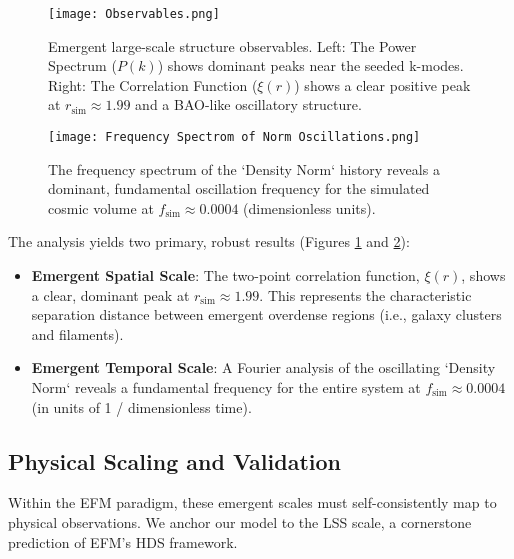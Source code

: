 \documentclass[11pt]{article}
\begin{document}
\begin{figure}[htbp]
\centering
\texttt{[image: Observables.png]} %
\caption{Emergent large-scale structure observables. Left: The Power Spectrum (\(P(k)\)) shows dominant peaks near the seeded k-modes. Right: The Correlation Function (\(\xi(r)\)) shows a clear positive peak at \(r_{\text{sim}} \approx 1.99\) and a BAO-like oscillatory structure.}
\label{fig:lss_observables}
\end{figure}

\begin{figure}[htbp]
\centering
\texttt{[image: Frequency Spectrom of Norm Oscillations.png]} %
\caption{The frequency spectrum of the `Density Norm` history reveals a dominant, fundamental oscillation frequency for the simulated cosmic volume at \(f_{\text{sim}} \approx 0.0004\) (dimensionless units).}
\label{fig:frequency_spectrum}
\end{figure}

The analysis yields two primary, robust results (Figures \ref{fig:lss_observables} and \ref{fig:frequency_spectrum}):
\begin{itemize}
    \item \textbf{Emergent Spatial Scale}: The two-point correlation function, \(\xi(r)\), shows a clear, dominant peak at \(r_{\text{sim}} \approx 1.99\). This represents the characteristic separation distance between emergent overdense regions (i.e., galaxy clusters and filaments).
    \item \textbf{Emergent Temporal Scale}: A Fourier analysis of the oscillating `Density Norm` reveals a fundamental frequency for the entire system at \(f_{\text{sim}} \approx 0.0004\) (in units of 1 / dimensionless time).
\end{itemize}

\subsection{Physical Scaling and Validation}
Within the EFM paradigm, these emergent scales must self-consistently map to physical observations. We anchor our model to the LSS scale, a cornerstone prediction of EFM's HDS framework.
\end{document}
